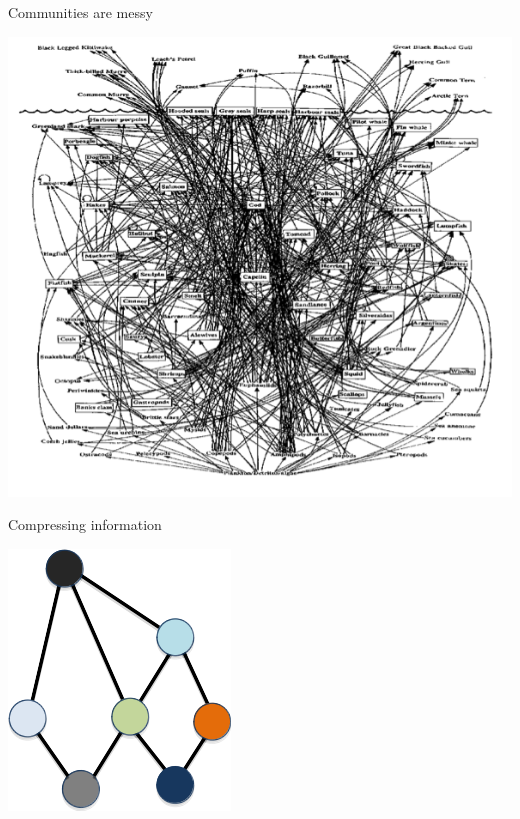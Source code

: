 \documentclass{eecslides}
\begin{document}
	\begin{frame}{Communities are messy}
		\begin{center}
		\includegraphics[height=0.65\textheight]{cod}\\
		\end{center}	
	\end{frame}


	\begin{frame}{Compressing information}
		\begin{center}
		\includegraphics[height=0.5\textheight]{simple_network}\\
		\end{center}	
	\end{frame}
\end{document}
